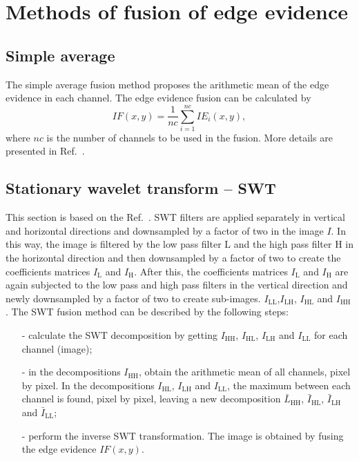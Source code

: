 \documentclass[conference]{IEEEtran}
\begin{document}
\section{Methods of fusion of edge evidence}\label{sec_07}

\subsection{Simple average}
The simple average fusion method proposes the arithmetic mean of the edge evidence in each channel. 
The edge evidence fusion can be calculated by
\begin{equation}
	IF(x,y)=\frac{1}{nc}\sum_{i=1}^{nc}IE_i(x,y),
\end{equation}
where $nc$ is the number of channels to be used in the fusion. 
More details are presented in Ref.~\cite{mit}.

\subsection{Stationary wavelet transform -- SWT} 

This section is based on the Ref.~\cite{n_r}. SWT filters are applied separately in vertical and horizontal directions and downsampled by a factor of two in the image $I$. In this way, the image is filtered by the low pass filter $\text{L}$ and the high pass filter $\text{H}$ in the horizontal direction and then downsampled by a factor of two to create the coefficients matrices $I_\text{L}$ and $I_\text{H}$. After this, the coefficients matrices $I_\text{L}$ and $I_\text{H}$ are again subjected to the low pass and high pass filters in the vertical direction and newly downsampled by a factor of two to create sub-images. $ I_\text{LL}$,$I_\text{LH}$, $I_\text{HL}$ and $I_\text{HH}$.
The SWT fusion method can be described by the following steps:
\begin{itemize}
\item[-] calculate the SWT decomposition by getting $I_\text{HH}$, $I_\text{HL}$, $I_\text{LH}$ and $I_\text{LL}$ for each channel (image); %
\item[-] in the decompositions $I_\text{HH}$, obtain the arithmetic mean of all channels, pixel by pixel. In the decompositions $I_\text{HL}$, $I_\text{LH}$ and $I_\text{LL}$, the maximum between each channel is found, pixel by pixel, leaving a new decomposition $\bar{L}_\text{HH}$, $\bar{I}_\text{HL}$, $\bar{I}_\text{LH}$ and $\bar{I}_\text{LL}$;
\item[-] perform the inverse SWT transformation. The image is obtained by fusing the edge evidence $IF(x,y)$.  
\end{itemize}
\end{document}
